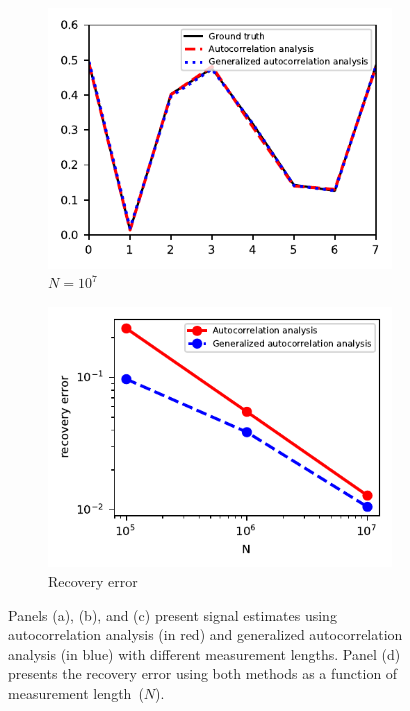 \documentclass{article}
\begin{document}
\begin{figure}[!tb]
\begin{subfigure}[ht]{0.245\textwidth}
		\includegraphics[width=\columnwidth]{figures/recovery_3.pdf}
		\caption{$N = 10^7$}
	\end{subfigure}
	\hfill
	\begin{subfigure}[ht]{0.245\textwidth}
		\centering
		\includegraphics[width=\columnwidth]{figures/recovery_errs.pdf}
		\caption{Recovery error}
	\end{subfigure}
	\caption{Panels (a), (b), and (c) present signal estimates using autocorrelation analysis (in red) and generalized autocorrelation analysis (in blue) with different measurement lengths. Panel (d) presents the recovery error using both methods as a function of measurement length~{($N$)}.}
\label{fig:recoveries}
\end{figure}
\end{document}
